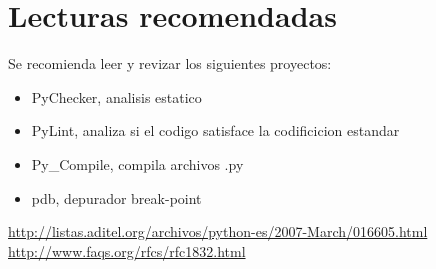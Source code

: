 \documentclass[10pt,a4paper]{article}
\begin{document}
\newpage
\section{Lecturas recomendadas}
Se recomienda leer y revizar los siguientes proyectos:
\begin{itemize}
\item PyChecker, analisis estatico
\item PyLint, analiza si el codigo satisface la codificicion estandar
\item Py\_Compile, compila archivos \*.py
\item pdb, depurador break-point
\end{itemize}

\pagebreak

\begin{thebibliography}{2}
 \url{http://listas.aditel.org/archivos/python-es/2007-March/016605.html}
 \url{http://www.faqs.org/rfcs/rfc1832.html}
\end{thebibliography}
\end{document}
